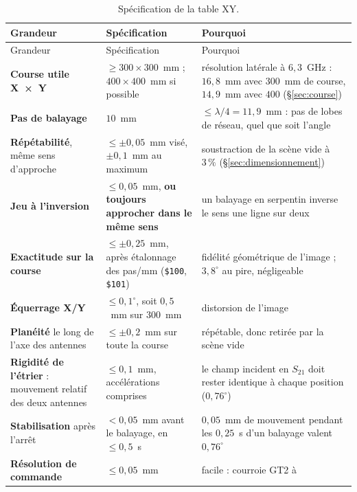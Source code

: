 \documentclass[11pt,a4paper]{article}
\begin{document}
\begin{longtable}{>{\raggedright\arraybackslash}p{3.3cm}
                  >{\raggedright\arraybackslash}p{5.0cm}
                  >{\raggedright\arraybackslash}p{6.3cm}}
\caption{Spécification de la table XY.}\label{tab:spec}\\
\toprule
Grandeur & Spécification & Pourquoi \\
\midrule
\endfirsthead
\toprule
Grandeur & Spécification & Pourquoi \\
\midrule
\endhead
\bottomrule
\endfoot
\textbf{Course utile \mbox{X × Y}} & $\ge 300 \times 300$~mm ; $400 \times 400$~mm si
  possible & résolution latérale à $6{,}3$~GHz : $16{,}8$~mm avec $300$~mm de
  course, $14{,}9$~mm avec $400$ (\S\ref{sec:course}) \\
\addlinespace
\textbf{Pas de balayage} & $10$~mm & $\le \lambda/4 = 11{,}9$~mm : pas de lobes de
  réseau, quel que soit l'angle \\
\addlinespace
\textbf{Répétabilité}, même sens d'approche & $\le \pm 0{,}05$~mm visé,
  $\pm 0{,}1$~mm au maximum & soustraction de la scène vide à $3\,\%$
  (\S\ref{sec:dimensionnement}) \\
\addlinespace
\textbf{Jeu à l'inversion} & $\le 0{,}05$~mm, \textbf{ou toujours approcher
  dans le même sens} & un balayage en serpentin inverse le sens une ligne sur
  deux \\
\addlinespace
\textbf{Exactitude sur la course} & $\le \pm 0{,}25$~mm, après étalonnage des
  pas/mm (\texttt{\$100}, \texttt{\$101}) & fidélité géométrique de l'image ;
  $3{,}8^\circ$ au pire, négligeable \\
\addlinespace
\textbf{Équerrage X/Y} & $\le 0{,}1^\circ$, soit $0{,}5$~mm sur $300$~mm &
  distorsion de l'image \\
\addlinespace
\textbf{Planéité} le long de l'axe des antennes & $\le \pm 0{,}2$~mm sur toute
  la course & répétable, donc retirée par la scène vide \\
\addlinespace
\textbf{Rigidité de l'étrier} : mouvement relatif des deux antennes &
  $\le 0{,}1$~mm, accélérations comprises & le champ incident en $S_{21}$ doit
  rester identique à chaque position ($0{,}76^\circ$) \\
\addlinespace
\textbf{Stabilisation} après l'arrêt & $< 0{,}05$~mm avant le balayage, en
  $\le 0{,}5$~s & $0{,}05$~mm de mouvement pendant les $0{,}25$~s d'un balayage
  valent $0{,}76^\circ$ \\
\addlinespace
\textbf{Résolution de commande} & $\le 0{,}05$~mm & facile : courroie GT2 à

\end{longtable}
\end{document}
